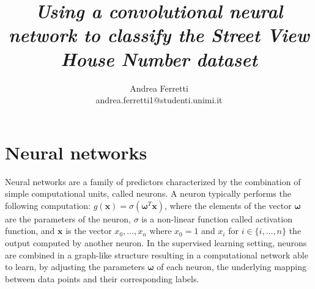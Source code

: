 \documentclass[12pt]{article}
\title{{\it Using a convolutional neural network to classify the Street View House Number dataset}}
\author
{Andrea Ferretti\\
\normalsize{andrea.ferretti1@studenti.unimi.it}
}
\date{}
\newcommand{\vect}[1]{\boldsymbol{#1}}
\begin{document}
 


\baselineskip24pt


\maketitle 



\section*{Neural networks}
Neural networks are a family of predictors characterized by the combination of simple computational units, called neurons.
A neuron typically performs the following computation: $ g(\vect{x}) = \sigma(\vect{\omega}^T \vect{x}) $, where the elements of the vector $\vect{\omega}$ are the parameters of the neuron, $\sigma$ is a non-linear function called activation function, and $\vect{x}$ is the vector $x_0,\ldots,x_n $ where $ x_0 = 1$ and $x_i$ for $i \in \{i,\ldots,n\}$  the output computed by another neuron.
In the supervised learning setting, neurons are combined in a graph-like structure resulting in a computational network able to learn, by adjusting the parameters $\vect{\omega}$ of each neuron, the underlying mapping between data points and their corresponding labels.
\end{document}
